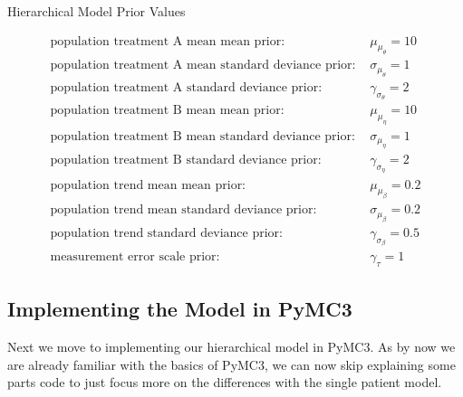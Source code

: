\documentclass[12pt,a4paper,leqno]{report}
\theoremstyle{plain}
\theoremstyle{definition}
\theoremstyle{remark}
\begin{document}
\begin{table}[H]
    \caption{Hierarchical Model Prior Values}\label{hierarchicalmodelpriorvalues}
    \begin{align}\label{}
        \text{population treatment A mean mean prior: } & \mu_{\mu_{\theta}} = 10 \nonumber \\
        \text{population treatment A mean standard deviance prior: } & \sigma_{\mu_{\theta}} = 1 \nonumber \\
        \text{population treatment A standard deviance prior: } & \gamma_{\sigma_{\theta}} = 2 \nonumber \\
        \text{population treatment B mean mean prior: } & \mu_{\mu_{\eta}} = 10 \nonumber \\
        \text{population treatment B mean standard deviance prior: } & \sigma_{\mu_{\eta}} = 1 \nonumber \\
        \text{population treatment B standard deviance prior: } & \gamma_{\sigma_{\eta}} = 2 \nonumber \\
        \text{population trend mean mean prior: } & \mu_{\mu_{\beta}} = 0.2 \nonumber \\
        \text{population trend mean standard deviance prior: } & \sigma_{\mu_{\beta}} = 0.2 \nonumber \\
        \text{population trend standard deviance prior: } & \gamma_{\sigma_{\beta}} = 0.5 \nonumber \\
        \text{measurement error scale prior: } & \gamma_{\tau} = 1 \nonumber
    \end{align}
\end{table}

\subsection{Implementing the Model in PyMC3}

Next we move to implementing our hierarchical model in PyMC3. As by now we are already
familiar with the basics of PyMC3, we can now skip explaining some parts code to just focus
more on the differences with the single patient model.
\end{document}
